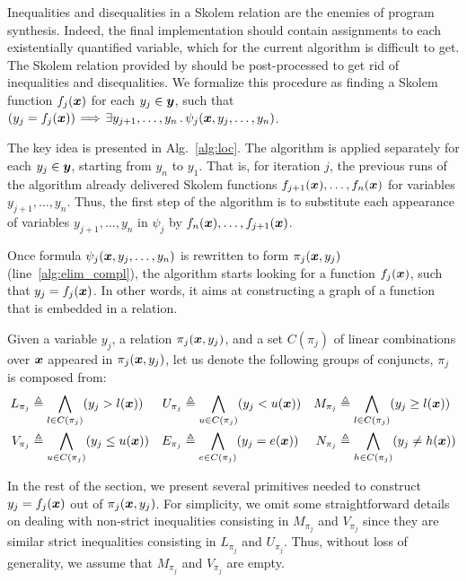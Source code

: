 Inequalities and disequalities in a Skolem relation are the enemies of program synthesis.
Indeed, the final implementation should contain assignments to each
existentially quantified variable, which for the current algorithm is difficult to
get.
The Skolem relation provided by \aeval should be post-processed to get rid of inequalities and disequalities.
We formalize this procedure as finding a Skolem function $f_j(\vx)$ for each $y_j\in \vy$, such that $(y_j = f_j(\vx)) \!\implies\! \exists y_{j+1},\ldots,y_{n} \such \psi_j(\vx,y_{j},\ldots,y_{n})$.

The key idea is presented in Alg.~\ref{alg:loc}.
The algorithm is applied separately for each $y_j \in \vy$, starting from $y_n$ to $y_1$.
That is, for iteration $j$, the previous runs of the algorithm  already delivered Skolem functions $f_{j+1}(\vx),\ldots,f_{n}(\vx)$ for variables $y_{j+1},\ldots,y_n$.
Thus, the first step of the algorithm is to substitute each appearance of variables $y_{j+1},\ldots, y_{n}$ in $\psi_j$ by $f_{n}(\vx),\ldots,f_{j+1}(\vx)$.

Once formula $\psi_j(\vx,y_{j},\ldots,y_{n})$ is rewritten to form $\pi_j(\vx,y_{j})$ (line~\ref{alg:elim_compl}), the algorithm starts looking for a function $f_j(\vx)$, such that $y_j = f_j(\vx)$.
In other words, it aims at constructing a graph of a function that is embedded in a relation.

\begin{definition}
Given a variable $y_j$, a relation $\pi_j(\vx,y_{j})$, and a set $C({\pi_j})$ of linear combinations over $\vx$ appeared in $\pi_j(\vx,y_{j})$, let us denote the following groups of conjuncts, $\pi_j$ is composed from:
\begin{align*}
L_{\pi_j} &\triangleq \Land_{l \in C({\pi_j})}(y_j > l(\vx)) &
U_{\pi_j} &\triangleq \Land_{u \in C({\pi_j})}(y_j < u(\vx)) &  
M_{\pi_j} &\triangleq \Land_{l \in C({\pi_j})}(y_j \ge l(\vx)) \\
V_{\pi_j} &\triangleq \Land_{u \in C({\pi_j})}(y_j \le u(\vx))  &
E_{\pi_j} &\triangleq \Land_{e \in C({\pi_j})}(y_j = e(\vx))  &
N_{\pi_j} &\triangleq \Land_{h \in C({\pi_j})}(y_j \neq h(\vx))  
\end{align*}
\end{definition}

\localfactoralg

In the rest of the section, we present several primitives needed to construct $y_j = f_j(\vx)$ out of $\pi_j(\vx,y_{j})$.
For simplicity, we omit some straightforward details on dealing with
non-strict inequalities consisting in $M_{\pi_j}$ and $V_{\pi_j}$ since
they are similar strict inequalities consisting in $L_{\pi_j}$ and $U_{\pi_j}$.
Thus,  without loss of generality, we assume that $M_{\pi_j}$ and $V_{\pi_j}$ are empty.


